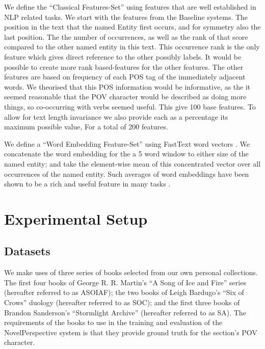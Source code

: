 \documentclass[11pt,a4paper]{article}
\newcommand{\parencite}{\citep}
\begin{document}
We define the  ``Classical Features-Set'' using features that are well established in NLP related tasks.
We start with the features from the Baseline systems.
The position in the text that the named Entity first occurs, and for symmetry also the last position.
The the number of occurrences, as well as the rank of that score compared to the other named entity in this text.
This occurrence rank is the only feature which gives direct reference to the other possibly labels.
It would be possible to create more rank based-features for the other features.
The other features are based on frequency of each POS tag of the immediately adjacent words.
We theorised that this POS information would be informative, as the it seemed reasonable that the POV character would be described as doing more things, so co-occurring with verbs seemed useful.
This give 100 base features.
To allow for text length invariance we also provide each as a percentage its maximum possible value, For a total of 200 features.

We define a ``Word Embedding Feature-Set'' using FastText word vectors \parencite{bojanowski2016enriching}.
We concatenate the word embedding for the a 5 word window to either size of the named entity;
and take the element-wise mean of this concentrated vector over all occurrences of the named entity.
Such averages of word embeddings have been shown to be a rich and useful feature in many tasks \cite{White2015SentVecMeaning,mikolovSkip}.





\section{Experimental Setup}\label{sec:experimental-setup}
\subsection{Datasets}
We make uses of three series of books selected from our own personal collections.
The first four books of George R. R. Martin's ``A Song of Ice and Fire'' series (hereafter referred to as ASOIAF);
the two books of  Leigh Bardugo's ``Six of Crows'' duology (hereafter referred to as SOC);
and the first three books of Brandon Sanderson's ``Stormlight Archive'' (hereafter referred to as SA).
The requirements of the books to use in the training and evaluation of the NovelPerspective system is that they provide ground truth for the section's POV  character.
\end{document}

